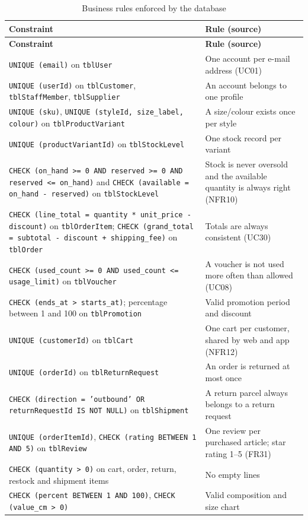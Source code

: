 {\small
\begin{xltabular}{\textwidth}{@{}L{6.0cm} Y@{}}
\caption{Business rules enforced by the database}\label{tab:dbrules}\\
\toprule
\textbf{Constraint} & \textbf{Rule (source)} \\ \midrule
\endfirsthead
\toprule
\textbf{Constraint} & \textbf{Rule (source)} \\ \midrule
\endhead
\bottomrule
\endlastfoot
\texttt{UNIQUE (email)} on \texttt{tblUser} & One account per e-mail address (UC01) \\
\texttt{UNIQUE (userId)} on \texttt{tblCustomer}, \texttt{tblStaffMember}, \texttt{tblSupplier} & An account belongs to one profile \\
\texttt{UNIQUE (sku)}, \texttt{UNIQUE (styleId, size\_label, colour)} on \texttt{tblProductVariant} & A size/colour exists once per style \\
\texttt{UNIQUE (productVariantId)} on \texttt{tblStockLevel} & One stock record per variant \\
\texttt{CHECK (on\_hand >= 0 AND reserved >= 0 AND reserved <= on\_hand)} and \texttt{CHECK (available = on\_hand - reserved)} on \texttt{tblStockLevel} & Stock is never oversold and the available quantity is always right (NFR10) \\
\texttt{CHECK (line\_total = quantity * unit\_price - discount)} on \texttt{tblOrderItem}; \texttt{CHECK (grand\_total = subtotal - discount + shipping\_fee)} on \texttt{tblOrder} & Totals are always consistent (UC30) \\
\texttt{CHECK (used\_count >= 0 AND used\_count <= usage\_limit)} on \texttt{tblVoucher} & A voucher is not used more often than allowed (UC08) \\
\texttt{CHECK (ends\_at > starts\_at)}; percentage between 1 and 100 on \texttt{tblPromotion} & Valid promotion period and discount \\
\texttt{UNIQUE (customerId)} on \texttt{tblCart} & One cart per customer, shared by web and app (NFR12) \\
\texttt{UNIQUE (orderId)} on \texttt{tblReturnRequest} & An order is returned at most once \\
\texttt{CHECK (direction = 'outbound' OR returnRequestId IS NOT NULL)} on \texttt{tblShipment} & A return parcel always belongs to a return request \\
\texttt{UNIQUE (orderItemId)}, \texttt{CHECK (rating BETWEEN 1 AND 5)} on \texttt{tblReview} & One review per purchased article; star rating 1--5 (FR31) \\
\texttt{CHECK (quantity > 0)} on cart, order, return, restock and shipment items & No empty lines \\
\texttt{CHECK (percent BETWEEN 1 AND 100)}, \texttt{CHECK (value\_cm > 0)} & Valid composition and size chart \\
\end{xltabular}
}

